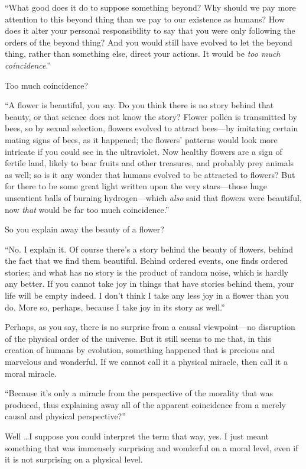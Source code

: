 {
 ``What good does it do to suppose something
beyond? Why should we pay more attention to this beyond thing than we
pay to our existence as humans? How does it alter your personal
responsibility to say that you were only following the orders of the
beyond thing? And you would still have evolved to let the beyond thing,
rather than something else, direct your actions. It would be
\textit{too much coincidence}.''}

{
 Too much coincidence?}

{
 ``A flower is beautiful, you say. Do you think
there is no story behind that beauty, or that science does not know the
story? Flower pollen is transmitted by bees, so by sexual selection,
flowers evolved to attract bees---by imitating certain mating signs of
bees, as it happened; the flowers' patterns would look
more intricate if you could see in the ultraviolet. Now healthy flowers
are a sign of fertile land, likely to bear fruits and other treasures,
and probably prey animals as well; so is it any wonder that humans
evolved to be attracted to flowers? But for there to be some great
light written upon the very stars---those huge unsentient balls of
burning hydrogen---which \textit{also} said that flowers were
beautiful, now \textit{that} would be far too much
coincidence.''}

{
 So you explain away the beauty of a flower?}

{
 ``No. I explain it. Of course
there's a story behind the beauty of flowers, behind
the fact that we find them beautiful. Behind ordered events, one finds
ordered stories; and what has no story is the product of random noise,
which is hardly any better. If you cannot take joy in things that have
stories behind them, your life will be empty indeed. I
don't think I take any less joy in a flower than you
do. More so, perhaps, because I take joy in its story as
well.''}

{
 Perhaps, as you say, there is no surprise from a causal
viewpoint---no disruption of the physical order of the universe. But it
still seems to me that, in this creation of humans by evolution,
something happened that is precious and marvelous and wonderful. If we
cannot call it a physical miracle, then call it a moral miracle.}

{
 ``Because it's only a miracle
from the perspective of the morality that was produced, thus explaining
away all of the apparent coincidence from a merely causal and physical
perspective?''}

{
 Well \ldots I suppose you could interpret the term that way, yes. I
just meant something that was immensely surprising and wonderful on a
moral level, even if it is not surprising on a physical level.}

